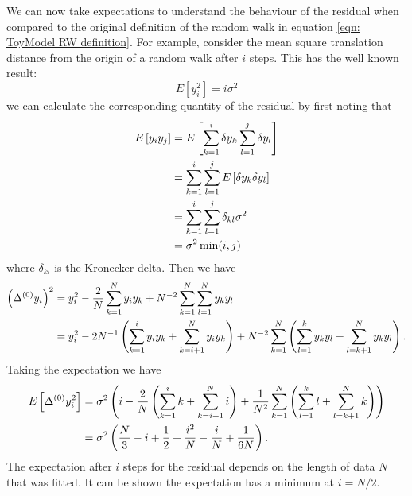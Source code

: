 

We can now take expectations to understand the behaviour of the residual when 
compared to the original definition of the random
walk in equation \ref{eqn: ToyModel RW definition}. For example, consider 
the mean square translation distance from the origin of a random walk after $i$
steps. This has the well known result:
\begin{equation}
E[y_{i}^{2}] = i \sigma^{2}
\end{equation}
we can calculate the corresponding quantity of the residual by first noting
that 
\begin{align}
E\left[y_{i}y_{j}\right] & = E\left[\sum_{k=1}^{i}\delta y_{k} \sum_{l=1}^{j}\delta y_{l} \right] \\ 
& = \sum_{k=1}^{i}\sum_{l=1}^{j}E\left[\delta y_{k} \delta y_{l}\right] \\
& = \sum_{k=1}^{i}\sum_{l=1}^{j} \delta_{kl} \sigma^{2} \\
& = \sigma^{2}\min(i, j)
\end{align}
where $\delta_{kl}$ is the Kronecker delta. Then we have
\begin{align}
\left(\Delta^{(0)} y_{i}\right)^{2} & = y_{i}^{2} - \frac{2}{N}\sum_{k=1}^{N}y_{i}y_{k} + N^{-2}\sum_{k=1}^{N}\sum_{l=1}^{N}y_{k}y_{l} \\
& =  y_{i}^{2} - 2 N^{-1} \left(\sum_{k=1}^{i}y_{i}y_{k} + \sum_{k=i+1}^{N}y_{i}y_{k} \right)+ N^{-2}\sum_{k=1}^{N}\left(\sum_{l=1}^{k}y_{k}y_{l} + \sum_{l=k+1}^{N}y_{k}y_{l} \right). 
\end{align}
Taking the expectation we have
\begin{align}
E\left[\Delta^{(0)} y_{i}^{2} \right] & = \sigma^{2}\left(i - \frac{2}{N}\left(\sum_{k=1}^{i}k + \sum_{k=i+1}^{N}i \right)+ \frac{1}{N^{2}}\sum_{k=1}^{N}\left(\sum_{l=1}^{k}l+ \sum_{l=k+1}^{N}k \right) \right) \\ 
& = \sigma^{2}\left(\frac{N}{3} - i + \frac{1}{2} + \frac{i^{2}}{N} - \frac{i}{N} + \frac{1}{6 N}\right).
\end{align}
The expectation after $i$ steps for the residual depends on the length of data
$N$ that was fitted. It can be shown the expectation has a minimum at $i=N/2$.

